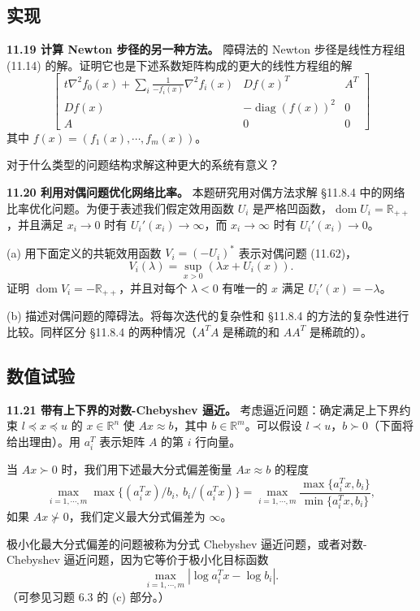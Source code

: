 \documentclass[UTF8,12pt,a4paper,fontset=fandol]{ctexart}
\begin{document}
\subsection*{实现}

\noindent\textbf{11.19 计算 Newton 步径的另一种方法。} 障碍法的 Newton 步径是线性方程组 (11.14) 的解。证明它也是下述系数矩阵构成的更大的线性方程组的解
\[
\begin{bmatrix}
t\nabla^2 f_0(x)+\displaystyle\sum_i\frac{1}{-f_i(x)}\nabla^2 f_i(x) & Df(x)^T & A^T\\
Df(x) & -\operatorname{diag}(f(x))^2 & 0\\
A & 0 & 0
\end{bmatrix}
\]
其中 $f(x)=(f_1(x),\cdots,f_m(x))$。

对于什么类型的问题结构求解这种更大的系统有意义？

\noindent\textbf{11.20 利用对偶问题优化网络比率。} 本题研究用对偶方法求解 \S11.8.4 中的网络比率优化问题。为便于表述我们假定效用函数 $U_i$ 是严格凹函数，$\operatorname{dom}U_i=\mathbb{R}_{++}$，并且满足 $x_i\to 0$ 时有 $U_i'(x_i)\to\infty$，而 $x_i\to\infty$ 时有 $U_i'(x_i)\to 0$。

(a) 用下面定义的共轭效用函数 $V_i=(-U_i)^\ast$ 表示对偶问题 (11.62)，
\[
V_i(\lambda)=\sup_{x>0}(\lambda x+U_i(x)).
\]
证明 $\operatorname{dom}V_i=-\mathbb{R}_{++}$，并且对每个 $\lambda<0$ 有唯一的 $x$ 满足 $U_i'(x)=-\lambda$。

(b) 描述对偶问题的障碍法。将每次迭代的复杂性和 \S11.8.4 的方法的复杂性进行比较。同样区分 \S11.8.4 的两种情况（$A^TA$ 是稀疏的和 $AA^T$ 是稀疏的）。

\subsection*{数值试验}

\noindent\textbf{11.21 带有上下界的对数-Chebyshev 逼近。} 考虑逼近问题：确定满足上下界约束 $l\preceq x\preceq u$ 的 $x\in\mathbb{R}^n$ 使 $Ax\approx b$，其中 $b\in\mathbb{R}^m$。可以假设 $l\prec u$，$b\succ 0$（下面将给出理由）。用 $a_i^T$ 表示矩阵 $A$ 的第 $i$ 行向量。

当 $Ax\succ 0$ 时，我们用下述最大分式偏差衡量 $Ax\approx b$ 的程度
\[
\max_{i=1,\cdots,m}\max\{(a_i^Tx)/b_i,\ b_i/(a_i^Tx)\}
=
\max_{i=1,\cdots,m}\frac{\max\{a_i^Tx,b_i\}}{\min\{a_i^Tx,b_i\}},
\]
如果 $Ax\not\succ 0$，我们定义最大分式偏差为 $\infty$。

极小化最大分式偏差的问题被称为分式 Chebyshev 逼近问题，或者对数-Chebyshev 逼近问题，因为它等价于极小化目标函数
\[
\max_{i=1,\cdots,m}|\log a_i^Tx-\log b_i|.
\]
（可参见习题 6.3 的 (c) 部分。）
\end{document}
